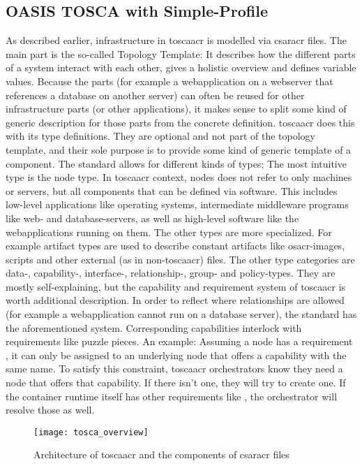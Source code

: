 \subsection{OASIS TOSCA with Simple-Profile}
As described earlier, infrastructure in \gls{toscaacr} is modelled via \gls{csaracr} files. The main part is the so-called Topology Template: It describes how the different parts of a system interact with each other, gives a holistic overview and defines variable values. Because the parts (for example a webapplication on a webserver that references a database on another server) can often be reused for other infrastructure parts (or other applications), it makes sense to split some kind of generic description for those parts from the concrete definition. \Gls{toscaacr} does this with its type definitions. They are optional and not part of the topology template, and their sole purpose is to provide some kind of generic template of a component. The standard allows for different kinds of types; The most intuitive type is the node type. In \gls{toscaacr} context, nodes does not refer to only machines or servers, but all components that can be defined via software. This includes low-level applications like operating systems, intermediate middleware programs like web- and database-servers, as well as high-level software like the webapplications running on them. The other types are more specialized. For example artifact types are used to describe constant artifacts like \gls{osacr}-images, scripts and other external (as in non-\gls{toscaacr}) files. The other type categories are data-, capability-, interface-, relationship-, group- and policy-types. They are mostly self-explaining, but the capability and requirement system of \gls{toscaacr} is worth additional description. In order to reflect where relationships are allowed (for example a webapplication cannot run on a database server), the standard has the aforementioned system. Corresponding capabilities interlock with requirements like puzzle pieces. An example: Assuming a node has a requirement , it can only be assigned to an underlying node that offers a capability with the same name. To satisfy this constraint, \gls{toscaacr} orchestrators know they need a node that offers that capability. If there isn't one, they will try to create one. If the container runtime itself has other requirements like , the orchestrator will resolve those as well.

\begin{figure}[H]
  \texttt{[image: tosca\_overview]}
  \centering
  \caption{Architecture of \gls{toscaacr} and the components of \gls{csaracr} files} %
  \label{image:tosca_overview}
\end{figure}

